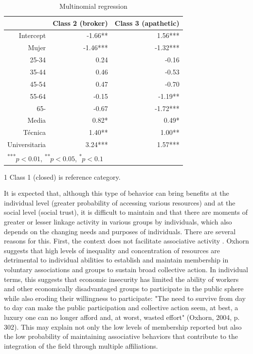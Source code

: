 \begin{table}[htp]
\centering
\begin{threeparttable}
\caption{\label{demo-table} Multinomial regression}
\begin{tabular}{rrr}
  \hline
 & Class 2 (broker) & Class 3 (apathetic)\\ 
  \hline
Intercept & -1.66** & 1.56*** \\ 
  Mujer & -1.46*** & -1.32*** \\ 
  25-34 & 0.24 & -0.16 \\ 
  35-44 & 0.46 & -0.53 \\ 
  45-54 & 0.47 & -0.70 \\ 
  55-64 & -0.15 & -1.19** \\ 
  65- & -0.67 & -1.72*** \\ 
  Media & 0.82* & 0.49* \\ 
  Técnica & 1.40** & 1.00** \\ 
  Universitaria & 3.24*** & 1.57*** \\ 
   \hline
\multicolumn{3}{l}{\textsuperscript{***}$p<0.01$, 
  \textsuperscript{**}$p<0.05$, 
  \textsuperscript{*}$p<0.1$}
\end{tabular}
\begin{tablenotes}
    \item[1] Class 1 (closed) is reference category.
  \end{tablenotes}
\end{threeparttable}
\end{table}


It is expected that, although this type of behavior can bring benefits at the individual level (greater probability of accessing various resources) and at the social level (social trust), it is difficult to maintain and that there are moments of greater or lesser linkage activity in various groups by individuals, which also depends on the changing needs and purposes of individuals. There are several reasons for this. First, the context does not facilitate associative activity \parencite{oxhorn_neopluralism_2004}. Oxhorn \parencite*{oxhorn_neopluralism_2004} suggests that high levels of inequality and concentration of resources are detrimental to individual abilities to establish and maintain membership in voluntary associations and groups to sustain broad collective action. In individual terms, this suggests that economic insecurity has limited the ability of workers and other economically disadvantaged groups to participate in the public sphere while also eroding their willingness to participate: "The need to survive from day to day can make the public participation and collective action seem, at best, a luxury one can no longer afford and, at worst, wasted effort" (Oxhorn, 2004, p. 302). This may explain not only the low levels of membership reported but also the low probability of maintaining associative behaviors that contribute to the integration of the field through multiple affiliations.


